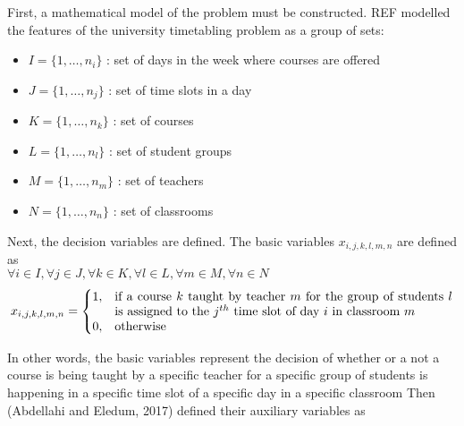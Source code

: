 \documentclass[a4paper, 12pt]{report}
\begin{document}
First, a mathematical model of the problem must be constructed. REF modelled 
the features of the university timetabling problem as a group of sets:
\begin{itemize}
	\item
		\begin{math}
			I = \{1, \dots , n_i\}
		\end{math}
		: set of days in the week where courses are offered
	\item
		\begin{math}
			J = \{1, \dots , n_j\}
		\end{math}
		: set of time slots in a day
	\item 
		\begin{math}
			K = \{1, \dots , n_k\}
		\end{math}
		: set of courses
	\item 
		\begin{math}
			L = \{1, \dots , n_l\}
		\end{math}
		: set of student groups
	\item 
		\begin{math}
			M = \{1, \dots , n_m\}
		\end{math}
		: set of teachers
	\item 
		\begin{math}
			N = \{1, \dots , n_n\}
		\end{math}
		: set of classrooms
\end{itemize}

Next, the decision variables are defined. The basic variables
\begin{math}
	x_{i,j,k,l,m,n}
\end{math}
are defined as \\
\begin{math}
	\forall i \in I, \forall j \in J, \forall k \in K, \forall l \in L, \forall
	m \in M, \forall n \in N
\end{math}
\begin{align}
	x_{i,j,k,l,m,n} = 
	\begin{cases}
		1, & \parbox[t]{9.5cm}{if a course $k$ taught by teacher $m$ for the
		group of students $l$ is assigned to the $j^{th}$ time slot of day $i$
		in classroom $m$} \\
		0, & \text{otherwise}
	\end{cases}	
\end{align}


In other words, the basic variables represent the decision of whether or a not
a course is being taught by a specific teacher for a specific group of students
is happening in a specific time slot of a specific day in a specific classroom
Then (Abdellahi and Eledum, 2017) defined their auxiliary variables as \\
\end{document}
